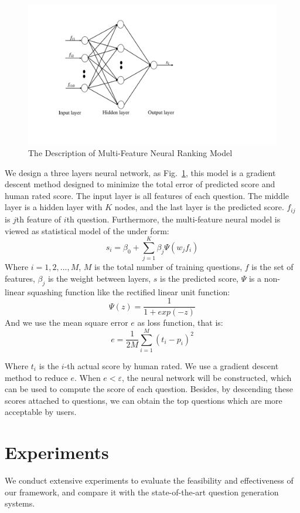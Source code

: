 \documentclass[runningheads,UTF8,article]{comsis2}
\begin{document}
	\begin{figure}[!ht]
		\centering
		\includegraphics[width=0.6\linewidth]{bp}
		\caption{The Description of Multi-Feature Neural Ranking Model}
		\label{bp}
	\end{figure}
	
	We design a three layers neural network, as Fig.~\ref{bp}, this model is a gradient descent method designed to minimize the total error of predicted score and human rated score.
	The input layer is all features of each question. The middle layer is a hidden layer with $K$ nodes, and the last layer is the predicted score. $f_{ij}$ is $j$th feature of $i$th question. Furthermore, the multi-feature neural model is viewed as statistical model of the under form:
	\begin{equation}
		s_i = \beta_0+\sum_{j=1}^{K}\beta_j\Psi(w_jf_i)
	\end{equation}
	Where $i=1,2,...,M$, $M $ is the total number of training questions, $f$ is the set of features, $ \beta_j $ is the weight between layers, $s$ is the predicted score, $ \Psi$ is a non-linear squashing function like the rectified linear unit function:
	\begin{equation}
		\Psi(z)= \frac{1}{1+exp(-z)}
	\end{equation}
	And we use the mean square error $ e $ as loss function, that is:
	\begin{equation}
		e = \frac{1}{2M}\sum_{i=1}^{M}(t_i-p_i)^2
	\end{equation}
	
	Where $ t_i $ is the $i$-th actual score by human rated. We use a gradient descent method to reduce $ e $. When $ e < \varepsilon$, the neural network will be constructed, which can be used to compute the score of each question. Besides, by descending these scores attached to questions, we can obtain the top questions which are more acceptable by users.

		
	
	
	
	
	\section{Experiments}
	We conduct extensive experiments to evaluate the feasibility and effectiveness of our framework, and compare it with the state-of-the-art question generation systems.
\end{document}
